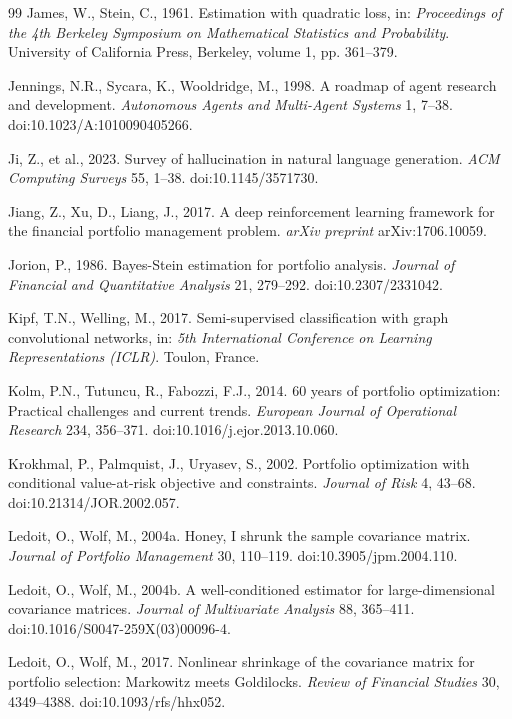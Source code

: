 \documentclass[11pt]{article}
\begin{document}
\begin{thebibliography}{99}
James, W., Stein, C., 1961. Estimation with quadratic loss, in: \textit{Proceedings of the 4th Berkeley Symposium on Mathematical Statistics and Probability}. University of California Press, Berkeley, volume 1, pp. 361--379.

Jennings, N.R., Sycara, K., Wooldridge, M., 1998. A roadmap of agent research and development. \textit{Autonomous Agents and Multi-Agent Systems} 1, 7--38. doi:10.1023/A:1010090405266.

Ji, Z., et al., 2023. Survey of hallucination in natural language generation. \textit{ACM Computing Surveys} 55, 1--38. doi:10.1145/3571730.

Jiang, Z., Xu, D., Liang, J., 2017. A deep reinforcement learning framework for the financial portfolio management problem. \textit{arXiv preprint} arXiv:1706.10059.

Jorion, P., 1986. Bayes-Stein estimation for portfolio analysis. \textit{Journal of Financial and Quantitative Analysis} 21, 279--292. doi:10.2307/2331042.

Kipf, T.N., Welling, M., 2017. Semi-supervised classification with graph convolutional networks, in: \textit{5th International Conference on Learning Representations (ICLR)}. Toulon, France.

Kolm, P.N., Tutuncu, R., Fabozzi, F.J., 2014. 60 years of portfolio optimization: Practical challenges and current trends. \textit{European Journal of Operational Research} 234, 356--371. doi:10.1016/j.ejor.2013.10.060.

Krokhmal, P., Palmquist, J., Uryasev, S., 2002. Portfolio optimization with conditional value-at-risk objective and constraints. \textit{Journal of Risk} 4, 43--68. doi:10.21314/JOR.2002.057.

Ledoit, O., Wolf, M., 2004a. Honey, I shrunk the sample covariance matrix. \textit{Journal of Portfolio Management} 30, 110--119. doi:10.3905/jpm.2004.110.

Ledoit, O., Wolf, M., 2004b. A well-conditioned estimator for large-dimensional covariance matrices. \textit{Journal of Multivariate Analysis} 88, 365--411. doi:10.1016/S0047-259X(03)00096-4.

Ledoit, O., Wolf, M., 2017. Nonlinear shrinkage of the covariance matrix for portfolio selection: Markowitz meets Goldilocks. \textit{Review of Financial Studies} 30, 4349--4388. doi:10.1093/rfs/hhx052.


\end{thebibliography}
\end{document}
